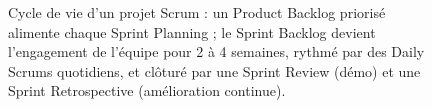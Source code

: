 \begin{figure}[H]
\begin{tikzpicture}
\end{tikzpicture}
\caption{Cycle de vie d'un projet Scrum : un Product Backlog priorisé alimente chaque Sprint Planning ; le Sprint Backlog devient l'engagement de l'équipe pour 2 à 4 semaines, rythmé par des Daily Scrums quotidiens, et clôturé par une Sprint Review (démo) et une Sprint Retrospective (amélioration continue).}
\label{fig:scrum-cycle}
\end{figure}
